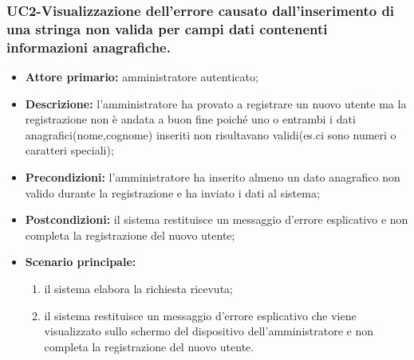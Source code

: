 \subsubsection{UC2-Visualizzazione dell'errore causato dall'inserimento di una stringa non valida per campi dati contenenti informazioni anagrafiche.}
\begin{itemize}
	\item \textbf{Attore primario:} amministratore autenticato;

	\item \textbf{Descrizione:} l'amministratore ha provato a registrare un nuovo utente ma la registrazione non è andata a buon fine poiché uno o entrambi i dati anagrafici(nome,cognome) inseriti non risultavano validi(es.ci sono numeri o caratteri speciali);

	\item \textbf{Precondizioni:} l'amministratore ha inserito almeno un dato anagrafico non valido durante la registrazione e ha inviato i dati al sistema;

	\item \textbf{Postcondizioni:} il sistema restituisce un messaggio d'errore esplicativo e non completa la registrazione del nuovo utente;

	\item \textbf{Scenario principale:}
		\begin{enumerate}
    		\item il sistema elabora la richiesta ricevuta;
    		\item il sistema restituisce un messaggio d'errore esplicativo che viene visualizzato sullo schermo del dispositivo dell'amministratore e non completa la registrazione del nuovo utente.
		\end{enumerate}
\end{itemize}

